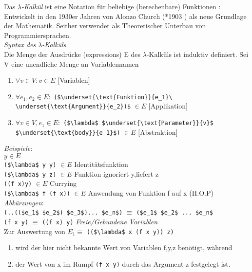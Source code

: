 Das \emph{$\lambda$-Kalkül} ist eine Notation für beliebige (berechenbare) Funktionen : Entwickelt in den 1930er Jahren von Alonzo Church (*1903  ) als neue Grundlage der Mathematik. Seither verwendet als Theoretischer Unterbau von Programmiersprachen.\\
\emph{Syntax des $\lambda$-Kalküls}\\
Die Menge der Ausdrücke (expressions) E des $\lambda$-Kalküls ist induktiv definiert. Sei V eine unendliche Menge an Variablennamen
\begin{enumerate}[-]
\item $\forall v \in V : v \in E$ \hfill $[$Variablen$]$
\item $\forall e_1,e_2 \in E:$ \lstinline[mathescape]|($\underset{\text{Funktion}}{e_1}\ \underset{\text{Argument}}{e_2})$| $\in E$ \hfill$[$Applikation$]$
\item $\forall v \in V, e_1 \in E :$ \lstinline[mathescape]|($\lambda$ $\underset{\text{Parameter}}{v}$ $\underset{\text{body}}{e_1}$)| $\in E$ \hfill $[$Abstraktion$]$
\end{enumerate}
\emph{Beispiele}:\\
$y \in E$\\
\lstinline[mathescape]|($\lambda$ y y)| $\in E$ Identitätsfunktion\\
\lstinline[mathescape]|($\lambda$ y z)| $\in E$ Funktion ignoriert y,liefert z\\
\lstinline[mathescape]|((f x)y)| $\in E$ Currying\\
\lstinline[mathescape]|($\lambda$ f (f x))| $\in E$ Anwendung von Funktion f auf x (H.O.P)\\
\emph{Abkürzungen}:\\
\lstinline[mathescape]|(..(($e_1$ $e_2$) $e_3$)... $e_n$)| $\equiv$ \lstinline[mathescape]|($e_1$ $e_2$ ... $e_n$|\\
\lstinline|(f x y)| $\equiv$ \lstinline|((f x) y)|
\emph{Freie/Gebundene Variablen}\\
Zur Auswertung von $E_1 \equiv$ \lstinline[mathescape]|(($\lambda$ x (f x y)) z)|
\begin{enumerate}[-]
\item wird der hier nicht bekannte Wert von Variablen f,y,z benötigt, während
\item der Wert von x im Rumpf \lstinline|(f x y)| durch das Argument z festgelegt ist.
\end{enumerate}
